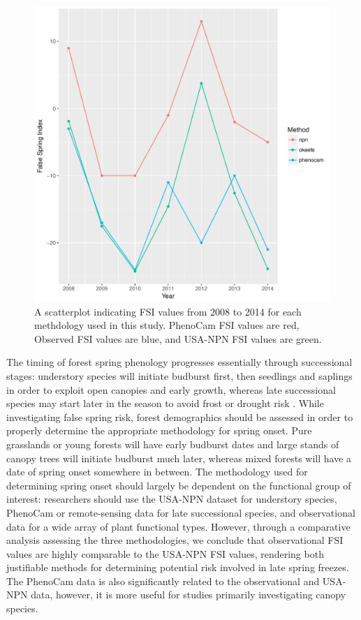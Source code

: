 \documentclass{article}\usepackage[]{graphicx}\usepackage[]{color}
\makeatletter
\def\maxwidth{ %
  \ifdim\Gin@nat@width>\linewidth
    \linewidth
  \else
    \Gin@nat@width
  \fi
}
\makeatother
\begin{document}
\begin{figure}[H]
\includegraphics[width=\maxwidth]{figure/fsifig-1} \caption[A scatterplot indicating FSI values from 2008 to 2014 for each methdology used in this study]{A scatterplot indicating FSI values from 2008 to 2014 for each methdology used in this study. PhenoCam FSI values are red, Observed FSI values are blue, and USA-NPN FSI values are green.}\label{fig:fsifig}
\end{figure}



The timing of forest spring phenology progresses essentially through successional stages: understory species will initiate budburst first, then seedlings and saplings in order to exploit open canopies and early growth, whereas late successional species may start later in the season to avoid frost or drought risk \citep{Xin2016, Richardson2009}. While investigating false spring risk, forest demographics should be assessed in order to properly determine the appropriate methodology for spring onset. Pure grasslands or young forests will have early budburst dates and large stands of canopy trees will initiate budburst much later, whereas mixed forests will have a date of spring onset somewhere in between. The methodology used for determining spring onset should largely be dependent on the functional group of interest: researchers should use the USA-NPN dataset for understory species, PhenoCam or remote-sensing data for late successional species, and observational data for a wide array of plant functional types. However, through a comparative analysis assessing the three methodologies, we conclude that observational FSI values are highly comparable to the USA-NPN FSI values, rendering both justifiable methods for determining potential risk involved in late spring freezes. The PhenoCam data is also significantly related to the observational and USA-NPN data, however, it is more useful for studies primarily investigating canopy species. 
\end{document}
